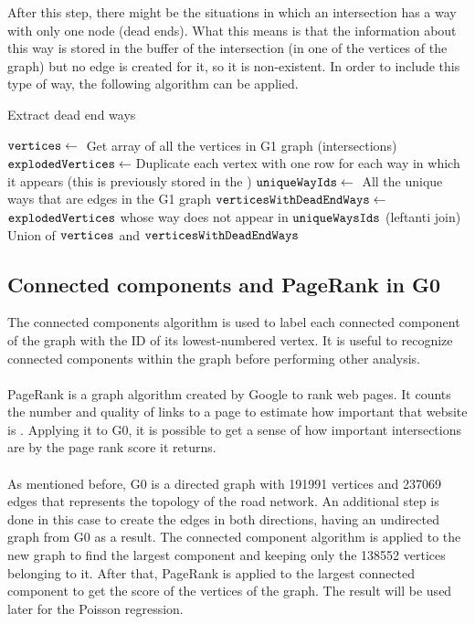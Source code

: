 After this step, there might be the situations in which an intersection has a way with only one node (dead ends). What this means is that the information about this way is stored in the buffer of the intersection (in one of the vertices of the graph) but no edge is created for it, so it is non-existent. In order to include this type of way, the following algorithm can be applied.


\begin{algorithm}[H]
\caption{Extract dead end ways}\label{alg:dead_end}
\begin{algorithmic}[1]
\State $\texttt{vertices} \leftarrow{}$ Get array of all the vertices in G1 graph (intersections)
\State $\texttt{explodedVertices} \leftarrow{}$Duplicate each vertex with one row for each way in which it appears (this is previously stored in the )
\State $\texttt{uniqueWayIds} \leftarrow{}$ All the unique ways that are edges in the G1 graph
\State $\texttt{verticesWithDeadEndWays} \leftarrow{}$ $\texttt{explodedVertices}$ whose way does not appear in $\texttt{uniqueWaysIds}$ (leftanti join)
\State Union of $\texttt{vertices}$ and $\texttt{verticesWithDeadEndWays}$
\end{algorithmic} 
\end{algorithm}

\subsection{Connected components and PageRank in G0}
The connected components algorithm is used to label each connected component of the graph with the ID of its lowest-numbered vertex. It is useful to recognize connected components within the graph before performing other analysis.
\\
\\
PageRank is a graph algorithm created by Google to rank web pages. It counts the number and quality of links to a page to estimate how important that website is \cite{spark-guide}. Applying it to G0, it is possible to get a sense of how important intersections are by the page rank score it returns. 
\\
\\
As mentioned before, G0 is a directed graph with 191991 vertices and  237069 edges that represents the topology of the road network. An additional step is done in this case to create the edges in both directions, having an undirected graph from G0 as a result. The connected component algorithm is applied to the new graph to find the largest component and keeping only the 138552 vertices belonging to it. After that, PageRank is applied to the largest connected component to get the score of the vertices of the graph. The result will be used later for the Poisson regression.



